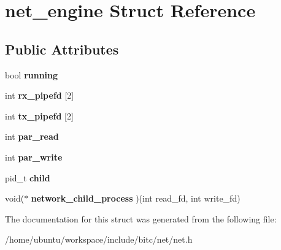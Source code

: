 \hypertarget{structnet__engine}{\section{net\-\_\-engine Struct Reference}
\label{structnet__engine}
}
\subsection*{Public Attributes}
\begin{DoxyCompactItemize}
\item 
\hypertarget{structnet__engine_a805d4aa055cfeed48109c3a061c04ed0}{bool {\bfseries running}}\label{structnet__engine_a805d4aa055cfeed48109c3a061c04ed0}

\item 
\hypertarget{structnet__engine_a379eabeeb5822a6637d73edc1d9d3ccd}{int {\bfseries rx\-\_\-pipefd} \mbox{[}2\mbox{]}}\label{structnet__engine_a379eabeeb5822a6637d73edc1d9d3ccd}

\item 
\hypertarget{structnet__engine_acff2017f985a4af2ece7c5aae8afa4ab}{int {\bfseries tx\-\_\-pipefd} \mbox{[}2\mbox{]}}\label{structnet__engine_acff2017f985a4af2ece7c5aae8afa4ab}

\item 
\hypertarget{structnet__engine_a12a84cab6d9c3802c140723e64c5e6b0}{int {\bfseries par\-\_\-read}}\label{structnet__engine_a12a84cab6d9c3802c140723e64c5e6b0}

\item 
\hypertarget{structnet__engine_a2e7f2c5fb6b5c1257e3f165db5773c4e}{int {\bfseries par\-\_\-write}}\label{structnet__engine_a2e7f2c5fb6b5c1257e3f165db5773c4e}

\item 
\hypertarget{structnet__engine_a80c0804138e43aaca1bed3185357516d}{pid\-\_\-t {\bfseries child}}\label{structnet__engine_a80c0804138e43aaca1bed3185357516d}

\item 
\hypertarget{structnet__engine_a6c7b0e0e8e4cf9813f584e3a34578453}{void($\ast$ {\bfseries network\-\_\-child\-\_\-process} )(int read\-\_\-fd, int write\-\_\-fd)}\label{structnet__engine_a6c7b0e0e8e4cf9813f584e3a34578453}

\end{DoxyCompactItemize}


The documentation for this struct was generated from the following file\-:\begin{DoxyCompactItemize}
\item 
/home/ubuntu/workspace/include/bitc/net/net.\-h\end{DoxyCompactItemize}
